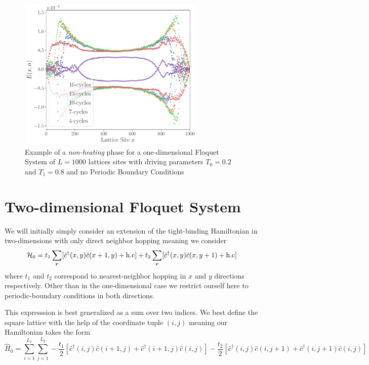 \documentclass[11pt, a4paper]{article}
\theoremstyle{definition} %
\newcommand{\vc}{\vb*}
\begin{document}
	
	\begin{figure}[h]
		\centering
		\includegraphics[width=0.8\textwidth]{Energy_Density2}
		\caption{Example of a \textit{non-heating} phase for a one-dimensional Floquet System of $L=1000$ lattices sites with driving parameters $T_0 = 0.2$ and $T_1 = 0.8$ and no Periodic Boundary Conditions}
	\end{figure}
	
	\section{Two-dimensional Floquet System}
	
	We will initially simply consider an extension of the tight-binding Hamiltonian in two-dimensions with only direct neighbor hopping meaning we consider
	\begin{equation}
		\mathcal{H}_0 = t_1\sum_{\vc{r}} [ \hat{c}^\dagger(x,y) \hat{c}(x+1, y) + \text{h.c}] + t_2\sum_{\vc{r}} [\hat{c}^\dagger(x,y) \hat{c}(x, y+1) + \text{h.c}]
	\end{equation}
	where $t_1$ and $t_2$ correspond to nearest-neighbor hopping in $x$ and $y$ directions respectively. Other than in the one-dimensional case we restrict ourself here to periodic-boundary conditions in both directions.
	
	
	This expresssion is best generalized as a sum over two indices. We best define the square lattice with the help of the coordinate tuple $(i, j)$ meaning our Hamiltonian takes the form
	\begin{equation}
		\hat{H}_0 =  \sum_{i = 1}^{L_x} \sum_{j=1}^{L_y} -\frac{t_1}{2} \left[ \hat{c}^\dagger(i, j) \hat{c}(i+1, j) + \hat{c}^\dagger(i+1, j)\hat{c}(i, j) \right] - \frac{t_2}{2} \left[\hat{c}^\dagger(i,j) \hat{c}(i,j+1) + \hat{c}^\dagger(i, j+1)\hat{c}(i,j) \right]
	\end{equation}
	
\end{document}
